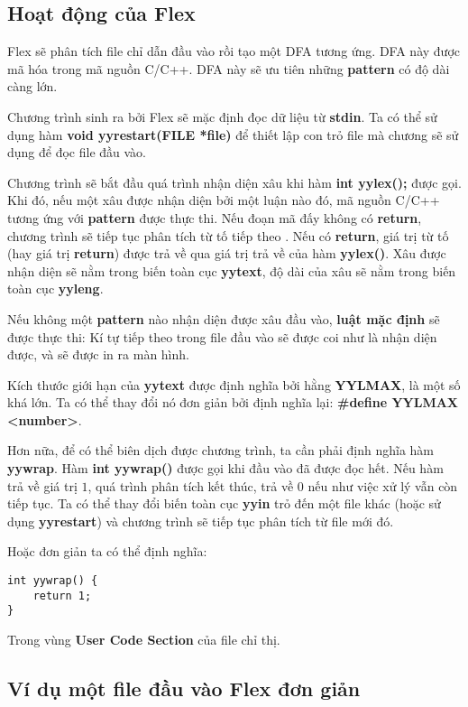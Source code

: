 \documentclass[../report.tex]{subfiles}
\begin{document}
\subsection{Hoạt động của Flex}
Flex sẽ phân tích file chỉ dẫn đầu vào rồi tạo một DFA tương ứng. 
DFA này được mã hóa trong mã nguồn C/C++. DFA này sẽ ưu tiên những \textbf{pattern}
có độ dài càng lớn.

Chương trình sinh ra bởi Flex sẽ mặc định đọc dữ liệu từ \textbf{stdin}.
Ta có thể sử dụng hàm \textbf{void yyrestart(FILE *file)} để thiết lập 
con trỏ file mà chương sẽ sử dụng để đọc file đầu vào. 

Chương trình sẽ bắt đầu quá trình nhận diện xâu khi hàm \textbf{int yylex();} được gọi. 
Khi đó, nếu một xâu được nhận diện bởi một luận nào đó, mã nguồn C/C++ tương ứng với \textbf{pattern} được 
thực thi. Nếu đoạn mã đấy không có \textbf{return}, chương trình sẽ tiếp tục phân 
tích từ tố tiếp theo \cite{return-stmt}. Nếu có \textbf{return}, giá trị từ tố (hay giá trị \textbf{return})
được trả về qua giá trị trả về của hàm \textbf{yylex()}.
Xâu được nhận diện sẽ nằm trong biến toàn cục \textbf{yytext}, 
độ dài của xâu sẽ nằm trong biến toàn cục \textbf{yyleng}.

Nếu không một \textbf{pattern} nào nhận diện được xâu đầu vào, 
\textbf{luật mặc định} sẽ được thực thi: 
Kí tự tiếp theo trong file đầu vào sẽ 
được coi như là nhận diện được, và sẽ được in ra màn hình. 

Kích thước giới hạn của \textbf{yytext} 
được định nghĩa bởi hằng \textbf{YYLMAX}, 
là một số khá lớn. 
Ta có thể thay đổi nó đơn giản bởi định nghĩa lại: 
\textbf{\#define YYLMAX <number>}.

Hơn nữa, để có thể biên dịch được chương trình, ta cần phải định nghĩa hàm \textbf{yywrap}.
Hàm \textbf{int yywrap()} được gọi khi đầu vào đã được đọc hết. Nếu hàm trả về giá trị $1$, 
quá trình phân tích kết thúc, trả về 0 nếu như việc xử lý vẫn còn tiếp tục. Ta có thể 
thay đổi biến toàn cục \textbf{yyin} trỏ đến một file khác (hoặc sử dụng \textbf{yyrestart})
và chương trình sẽ tiếp tục phân tích từ file mới đó. \cite{yywrap-yyin}

Hoặc đơn giản ta có thể định nghĩa: 
\begin{lstlisting}
int yywrap() {
    return 1;
}
\end{lstlisting}
Trong vùng \textbf{User Code Section} của file chỉ thị.

\subsection{Ví dụ một file đầu vào Flex đơn giản} 

\end{document}
